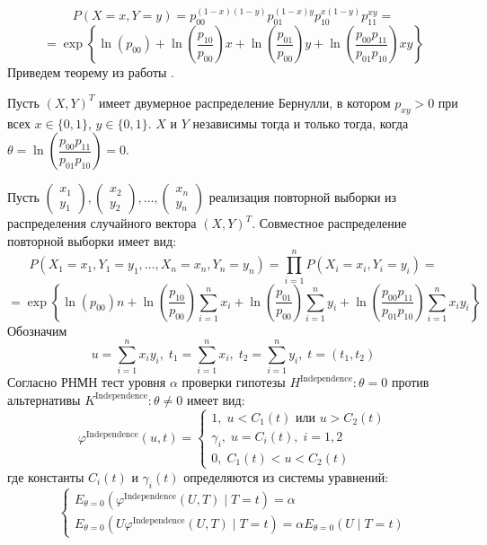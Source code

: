 $$
P(X=x,Y=y)=p_{00}^{(1-x)(1-y)}p_{01}^{(1-x)y}
p_{10}^{x(1-y)}p_{11}^{xy}=
$$
$$=\exp \left\{\ln(p_{00}) + 
     \ln \left(\dfrac{p_{10}}{p_{00}}\right) x
    +  \ln \left(\dfrac{p_{01}}{p_{00}}\right) y +
     \ln\left(\dfrac{p_{00}p_{11}}{p_{01}p_{10}}\right) xy
 \right\}
$$
Приведем теорему из работы \cite{Dai2013}.
\begin{theorem}
    Пусть $(X,Y)^T$ имеет двумерное распределение Бернулли,
    в котором $p_{xy} > 0$ при всех
    $x \in \{0,1\}$, $y\in \{0,1\}$. $X$ и $Y$ независимы тогда и только тогда, когда
$\theta=\ln\left(\dfrac{p_{00}p_{11}}{p_{01}p_{10}}\right)=0$.
\end{theorem}
Пусть
    $
        \begin{pmatrix}
            x_1 \\
            y_1 
        \end{pmatrix},
        \begin{pmatrix}
            x_2 \\
            y_2
        \end{pmatrix}, \ldots,
        \begin{pmatrix}
            x_n \\
            y_n
        \end{pmatrix}
    $
    реализация повторной выборки из распределения случайного вектора $(X,Y)^T$.
    Совместное распределение повторной выборки имеет вид:
$$
    P(X_1=x_1,Y_1=y_1,\ldots,X_n=x_n,Y_n=y_n)
    =\prod_{i=1}^n P(X_i=x_i,Y_i=y_i) =
    $$
    $$
    =\exp \left\{ \ln(p_{00})n + 
        \ln \left(\dfrac{p_{10}}{p_{00}}\right) \sum_{i=1}^n x_i 
        +\ln \left(\dfrac{p_{01}}{p_{00}}\right) \sum_{i=1}^{n} y_i   +
        \ln\left(\dfrac{p_{00}p_{11}}{p_{01}p_{10}}\right) \sum_{i=1}^n x_i y_i 
     \right\}
    $$
    Обозначим 
    $$
    u = \sum_{i=1}^n x_i y_i,\;
    t_1 = \sum_{i=1}^n x_i,\;
    t_2 = \sum_{i=1}^n y_i, \; t=(t_1,t_2)$$
    Согласно \cite{Lehmann1986} РНМН тест уровня $\alpha$ проверки гипотезы $H^{\text{Independence}}: \theta = 0$ против альтернативы $K^{\text{Independence}}: \theta \neq 0$ 
    имеет вид:
    $$
    \varphi^{\text{Independence}}(u,t)=\begin{cases}
        1, \; u<C_1(t) \text{ или } u>C_2(t)\\
        \gamma_i, \; u=C_i(t), \; i=1,2\\
        0, \; C_1(t)<u<C_2(t)
    \end{cases}
    $$
    где константы $C_i(t)$ и $\gamma_i(t)$ определяются из системы уравнений:
    $$
    \begin{cases}
        E_{\theta=0}(\varphi^{\text{Independence}}(U,T) \mid T=t)=\alpha \\
        E_{\theta=0}(U\varphi^{\text{Independence}}(U,T) \mid T=t)=\alpha E_{\theta=0}(U \mid T=t)
    \end{cases}
    $$
